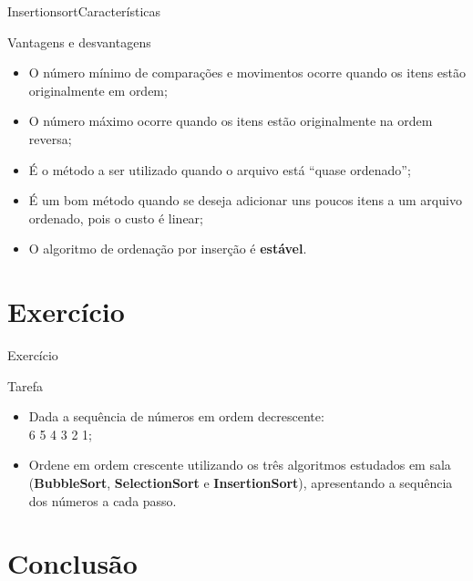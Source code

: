 \documentclass[aspectratio=169]{beamer}
\begin{document}

\begin{frame}{Insertionsort}{Características}
\begin{block}{Vantagens e desvantagens}
  \begin{itemize}
  \item O número mínimo de comparações e movimentos ocorre quando os itens estão originalmente em ordem;
  \item O número máximo ocorre quando os itens estão originalmente na ordem reversa;
  \item É o método a ser utilizado quando o arquivo está ``quase ordenado'';
  \item É um bom método quando se deseja adicionar uns poucos itens a um arquivo ordenado, pois o custo é linear;
  \item O algoritmo de ordenação por inserção é {\bf estável}.
  \end{itemize} 
\end{block}
\end{frame}

\section{Exercício}

\begin{frame}{Exercício}
\begin{block}{Tarefa}
  \begin{itemize}
  \item Dada a sequência de números em ordem decrescente: \\ 6 5 4 3 2 1;
  \item Ordene em ordem crescente utilizando os três algoritmos estudados em sala ({\bf BubbleSort}, {\bf SelectionSort} e {\bf InsertionSort}), apresentando a sequência dos números a cada passo.
  \end{itemize} 
\end{block}
\end{frame}

\section{Conclusão}
\end{document}
